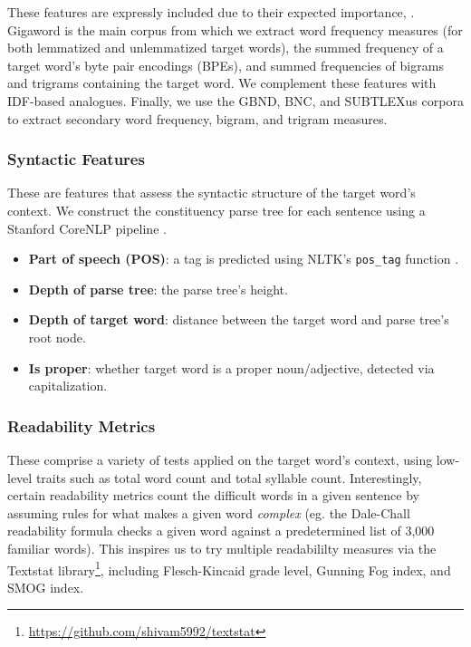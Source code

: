 \documentclass{dcthesis}
\theoremstyle{definition}
\theoremstyle{remark}
\begin{document}
These features are expressly included due to their expected importance, \citep{zampieriEtAl:2017:NLPTEA}. Gigaword is the main corpus from which we extract word frequency measures (for both lemmatized and unlemmatized target words), the summed frequency of a target word's byte pair encodings (BPEs), and summed frequencies of bigrams and trigrams containing the target word. We complement these features with IDF-based analogues. Finally, we use the GBND, BNC, and SUBTLEXus corpora to extract secondary word frequency, bigram, and trigram measures. 

\subsubsection{Syntactic Features}

These are features that assess the syntactic structure of the target word's context. We construct the constituency parse tree for each sentence using a Stanford CoreNLP pipeline \citep{manning-EtAl:2014:P14-5}.

\begin{itemize}
  \item \textbf{Part of speech (POS)}: a tag is predicted using NLTK's \texttt{pos\_tag} function \citep{Loper02nltk:the}.
  \item \textbf{Depth of parse tree}: the parse tree's height.
  \item \textbf{Depth of target word}: distance between the target word and parse tree's root node.
  \item \textbf{Is proper}: whether target word is a proper noun/adjective, detected via capitalization.
\end{itemize}

\subsubsection{Readability Metrics}

These comprise a variety of tests applied on the target word's context, using low-level traits such as total word count and total syllable count. Interestingly, certain readability metrics count the difficult words in a given sentence by assuming rules for what makes a given word \textit{complex} (eg. the Dale-Chall readability formula \citep{10.2307/1473169} checks a given word against a predetermined list of 3,000 familiar words). This inspires us to try multiple readabililty measures via the Textstat library\footnote{\url{https://github.com/shivam5992/textstat}}, including Flesch-Kincaid grade level, Gunning Fog index, and SMOG index.
\end{document}
